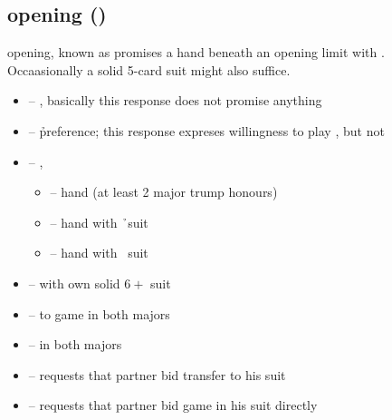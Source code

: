 \subsection{\ctr{2\protect\d} opening ()}
\label{subsec:2d-op}

\ctr{2\d} opening, known as  promises a hand beneath an opening limit with .
Occaasionally a solid 5-card suit might also suffice. \vspace{1em}

\begin{itemize}
  \item \ctr{2\h} -- \neg, basically this response does not promise anything
  \item \ctr{2\s} -- \h preference; this response expreses willingness to play \ctr{3\h}, but not \ctr{3\s}
  \item \ctr{2\nt} -- \gf, 
  \begin{itemize}
    \item \ctr{3\c} -- \pos\/ hand (at least 2 major trump honours)
    \item \ctr{3\d} -- \neg\/ hand with \h\ suit
    \item \ctr{3\h} -- \neg\/ hand with \s\ suit
  \end{itemize}
  \item \ctr{3\c} -- \gf\/ with own solid $6+$ suit
  \item \ctr{3\d} -- \inv\/ to game \ws{} in both majors
  \item \ctr{3\h} -- \preempt\/ \ws{} in both majors
  \item \ctr{4\c} -- requests that partner bid transfer to his suit
  \item \ctr{4\d} -- requests that partner bid game in his suit directly
\end{itemize}
